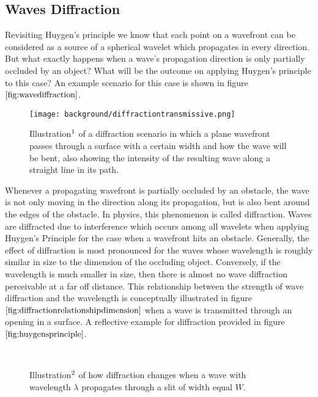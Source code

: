 \subsection{Waves Diffraction}
Revisiting Huygen's principle we know that each point on a wavefront can be considered as a source of a spherical wavelet which propagates in every direction. But what exactly happens when a wave's propagation direction is only partially occluded by an object? What will be the outcome on applying Huygen's principle to this case? An example scenario for this case is shown in figure $\ref{fig:wavediffraction}$. 

\begin{figure}[H]
  \centering
  \texttt{[image: background/diffractiontransmissive.png]}
  \caption[Diffracted Wave]{Illustration$\footnotemark$ of a diffraction scenario in which a plane wavefront passes through a surface with a certain width and how the wave will be bent, also showing the intensity of the resulting wave along a straight line in its path.}
  \label{fig:wavediffraction}
\end{figure}

Whenever a propagating wavefront is partially occluded by an obstacle, the wave is not only moving in the direction along its propagation, but is also bent around the edges of the obstacle. In physics, this phenomenon is called diffraction. Waves are diffracted due to interference which occurs among all wavelets when applying Huygen's Principle for the case when a wavefront hits an obstacle. Generally, the effect of diffraction is most pronounced for the waves whose wavelength is roughly similar in size to the dimension of the occluding object. Conversely, if the wavelength is much smaller in size, then there is almost no wave diffraction perceivable at a far off distance. This relationship between the strength of wave diffraction and the wavelength is conceptually illustrated in figure $\ref{fig:diffractionrelationshipdimension}$ when a wave is transmitted through an opening in a surface. A reflective example for diffraction provided in figure $\ref{fig:huygensprinciple}$.

\begin{figure}[H]
  \centering
~
~
  \caption[Diffraction for different $\texttt{Wavelength/Slit-Width}$ ratio]{Illustration$\footnotemark$ of how diffraction changes when a wave with wavelength $\lambda$ propagates through a slit of width equal $W$.}
  \label{fig:diffractionrelationshipdimension}
\end{figure}

